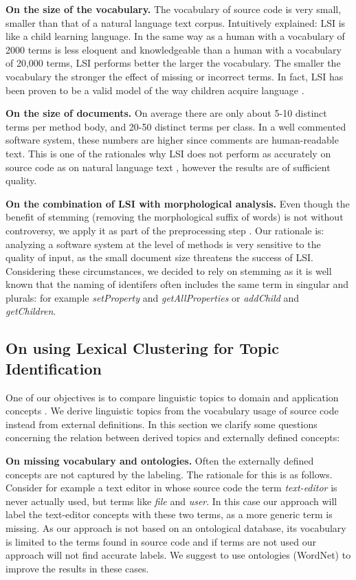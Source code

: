 \textbf{On the size of the vocabulary.}  The vocabulary of source code is very small, smaller than that of a natural language text corpus. Intuitively explained: LSI is like a child learning language. In the same way as a human with a vocabulary of 2000 terms is less eloquent and knowledgeable than a human with a vocabulary of 20,000 terms, LSI performs better the larger the vocabulary. The smaller the vocabulary the stronger the effect of missing or incorrect terms. In fact, LSI has been proven to be a valid model of the way children acquire language \cite{Land97a}.

\textbf{On the size of documents.} On average there are only about 5-10 distinct terms per method body, and 20-50 distinct terms per class. In a well commented software system, these numbers are higher since comments are human-readable text. This is one of the rationales why LSI does not perform as accurately on source code as on natural language text \cite{Luci04a}, however the results are of sufficient quality.

\textbf{On the combination of LSI with morphological analysis.} Even though the benefit of stemming (\ie removing the morphological suffix of words) is not without controversy, we apply it as part of the preprocessing step \cite{Baez99b}. Our rationale is: analyzing a software system at the level of methods is very sensitive to the quality of input, as the small document size threatens the success of LSI. Considering these circumstances, we  decided to rely on stemming as it is well known that the naming of identifers often includes the same term in singular and plurals: for example \emph{setProperty} and \emph{getAllProperties} or \emph{addChild} and \emph{getChildren}.

\subsection{On using Lexical Clustering for Topic Identification}

One of our objectives is to compare linguistic topics to domain and application concepts \cite{Bigg93a}. We derive linguistic topics from the vocabulary usage of source code instead from external definitions. In this section we clarify some questions concerning the relation between derived topics and externally defined concepts:

\textbf{On missing vocabulary and ontologies.} Often the externally defined concepts are not captured by the labeling. The rationale for this is as follows. Consider for example a text editor in whose source code the term \emph{text-editor} is never actually used, but terms like \emph{file} and \emph{user}. In this case our approach will label the text-editor concepts with these two terms, as a more generic term is missing. As our approach is not based on an ontological database, its vocabulary is limited to the terms found in source code and if terms are not used our approach will not find accurate labels. We suggest to use ontologies (\ie WordNet) to improve the results in these cases.

